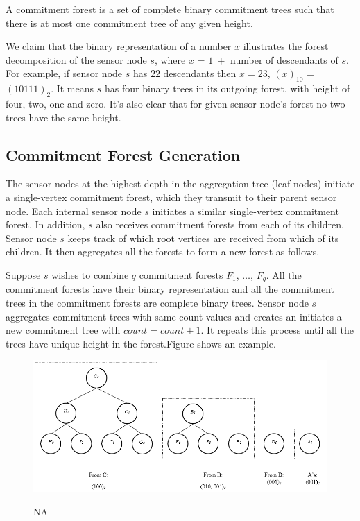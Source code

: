 		\begin{definition}\cite{chan2006secure}
		A commitment forest is a set of complete binary commitment trees such that there is at most one commitment tree of any given height.
		\end{definition}

		We claim that the binary representation of a number $x$ illustrates the forest decomposition of the sensor node $s$, where $x$ = $1\ +$ number of descendants of $s$.
		For example, if sensor node $s$ has $22$ descendants then $x =23$, $(x)_{10}$ = $(10111)_{2}$. 
		It means $s$ has four binary trees in its outgoing forest, with height of four, two, one and zero. It's also clear that for given sensor node's forest no two trees have the same height.

	\subsection{Commitment Forest Generation}
		The sensor nodes at the highest depth in the aggregation tree (leaf nodes) initiate a single-vertex commitment forest, which they transmit to their parent sensor node.
		Each internal sensor node $s$ initiates a similar single-vertex commitment forest.
		In addition, $s$ also receives commitment forests from each of its children.
		Sensor node $s$ keeps track of which root vertices are received from which of its children.
		It then aggregates all the forests to form a new forest as follows.
		
		Suppose $s$ wishes to combine $q$ commitment forests $F_{1}$, $\dotsc$, $F_{q}$.
		All the commitment forests have their binary representation and all the commitment trees in the commitment forests are complete binary trees. 
		Sensor node $s$ aggregates commitment trees with same count values and creates an initiates a new commitment tree with $count = count + 1$. It repeats this process until all the trees have unique height in the forest.Figure shows an example.


	\newpage
	\begin{figure}[hp]
		\centering
		\includegraphics[scale = 0.7]{images/commitment-tree-example-1.png}\\
		\caption{NA}
	\end{figure}

